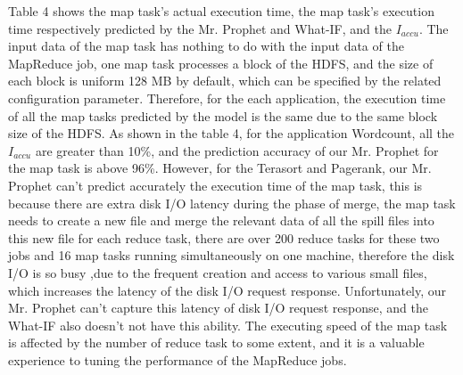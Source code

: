 Table 4 shows the map task's actual execution time, the map task's execution time respectively predicted by the Mr. Prophet and What-IF, and the $I_{accu}$. The input data of the map task has nothing to do with the input data of the MapReduce job, one map task processes a block of the HDFS, and the size of each block is uniform 128 MB by default, which can be specified by the related configuration parameter. Therefore, for the each application, the execution time of all the map tasks predicted by the model is the same due to the same block size of the HDFS. As shown in the table 4, for the application Wordcount, all the $I_{accu}$ are greater than 10\%, and the prediction accuracy of our Mr. Prophet for the map task is above 96\%. However, for the Terasort and Pagerank, our Mr. Prophet can't predict accurately the execution time of the map task, this is because there are extra disk I/O latency during the phase of merge, the map task needs to create a new file and merge the relevant data of all the spill files into this new file for each reduce task, there are over 200 reduce tasks for these two jobs and 16 map tasks running simultaneously on one machine, therefore the disk I/O is so busy ,due to the frequent creation and access to various small files, which increases the latency of the disk I/O request response. Unfortunately, our Mr. Prophet can't capture this latency of disk I/O request response, and the What-IF also doesn't not have this ability. The executing speed of the map task is affected by the number of reduce task to some extent, and it is a valuable experience to tuning the performance of the MapReduce jobs.


